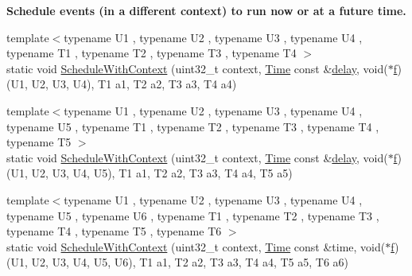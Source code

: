 \begin{Indent}{\bf Schedule events (in a different context) to run now or at a future time.}
\begin{DoxyCompactItemize}
\item 
{\footnotesize template$<$typename U1 , typename U2 , typename U3 , typename U4 , typename T1 , typename T2 , typename T3 , typename T4 $>$ }\\static void \hyperlink{classns3_1_1Simulator_a535d5caf2bbb4c95e9f6bc92116cce5a}{Schedule\+With\+Context} (uint32\+\_\+t context, \hyperlink{classns3_1_1Time}{Time} const \&\hyperlink{mmwave_2model_2fading-traces_2fading__trace__generator_8m_a7964e6aa8f61a9d28973c8267a606ad8}{delay}, void($\ast$\hyperlink{80211b_8c_ae7ffc1a8f84fa47a0812b2f2b9627132}{f})(U1, U2, U3, U4), T1 a1, T2 a2, T3 a3, T4 a4)
\item 
{\footnotesize template$<$typename U1 , typename U2 , typename U3 , typename U4 , typename U5 , typename T1 , typename T2 , typename T3 , typename T4 , typename T5 $>$ }\\static void \hyperlink{classns3_1_1Simulator_afe460097b94a72960d124d66e0922f8f}{Schedule\+With\+Context} (uint32\+\_\+t context, \hyperlink{classns3_1_1Time}{Time} const \&\hyperlink{mmwave_2model_2fading-traces_2fading__trace__generator_8m_a7964e6aa8f61a9d28973c8267a606ad8}{delay}, void($\ast$\hyperlink{80211b_8c_ae7ffc1a8f84fa47a0812b2f2b9627132}{f})(U1, U2, U3, U4, U5), T1 a1, T2 a2, T3 a3, T4 a4, T5 a5)
\item 
{\footnotesize template$<$typename U1 , typename U2 , typename U3 , typename U4 , typename U5 , typename U6 , typename T1 , typename T2 , typename T3 , typename T4 , typename T5 , typename T6 $>$ }\\static void \hyperlink{classns3_1_1Simulator_aa7f0c61802db68cf23beb2f184bea5bc}{Schedule\+With\+Context} (uint32\+\_\+t context, \hyperlink{classns3_1_1Time}{Time} const \&time, void($\ast$\hyperlink{80211b_8c_ae7ffc1a8f84fa47a0812b2f2b9627132}{f})(U1, U2, U3, U4, U5, U6), T1 a1, T2 a2, T3 a3, T4 a4, T5 a5, T6 a6)
\end{DoxyCompactItemize}
\end{Indent}
